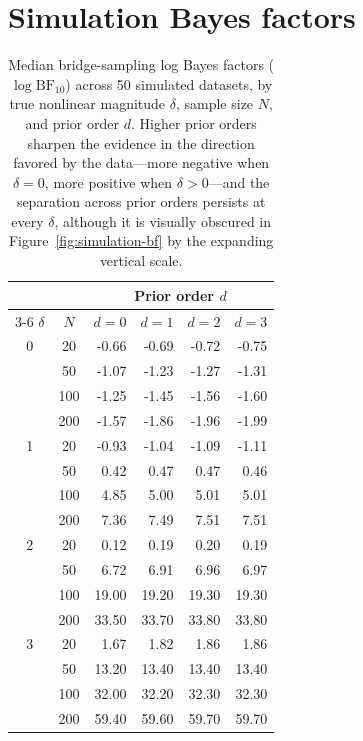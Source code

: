 \documentclass{article}
\begin{document}
\section{Simulation Bayes factors}
\label{app:sim-table}

\begin{table}[ht]
  \centering
  \caption{Median bridge-sampling log Bayes factors
  ($\log \mathrm{BF}_{10}$) across 50 simulated datasets, by true
  nonlinear magnitude $\delta$, sample size $N$, and prior order
  $d$. Higher prior orders sharpen the evidence in the direction
  favored by the data---more negative when $\delta=0$, more positive
  when $\delta>0$---and the separation across prior orders persists at
  every $\delta$, although it is visually obscured in
  Figure~\ref{fig:simulation-bf} by the expanding vertical scale.}
  \label{tab:bridge-medians}
  \begin{tabular}{ccrrrr}
    \toprule
    & & \multicolumn{4}{c}{Prior order $d$} \\
    \cmidrule(lr){3-6}
    $\delta$ & $N$ & $d=0$ & $d=1$ & $d=2$ & $d=3$ \\
    \midrule
    0 & 20 & -0.66 & -0.69 & -0.72 & -0.75 \\
     & 50 & -1.07 & -1.23 & -1.27 & -1.31 \\
     & 100 & -1.25 & -1.45 & -1.56 & -1.60 \\
     & 200 & -1.57 & -1.86 & -1.96 & -1.99 \\
    \midrule
    1 & 20 & -0.93 & -1.04 & -1.09 & -1.11 \\
     & 50 & 0.42 & 0.47 & 0.47 & 0.46 \\
     & 100 & 4.85 & 5.00 & 5.01 & 5.01 \\
     & 200 & 7.36 & 7.49 & 7.51 & 7.51 \\
    \midrule
    2 & 20 & 0.12 & 0.19 & 0.20 & 0.19 \\
     & 50 & 6.72 & 6.91 & 6.96 & 6.97 \\
     & 100 & 19.00 & 19.20 & 19.30 & 19.30 \\
     & 200 & 33.50 & 33.70 & 33.80 & 33.80 \\
    \midrule
    3 & 20 & 1.67 & 1.82 & 1.86 & 1.86 \\
     & 50 & 13.20 & 13.40 & 13.40 & 13.40 \\
     & 100 & 32.00 & 32.20 & 32.30 & 32.30 \\
     & 200 & 59.40 & 59.60 & 59.70 & 59.70 \\
    \bottomrule
  \end{tabular}
\end{table}
\end{document}
